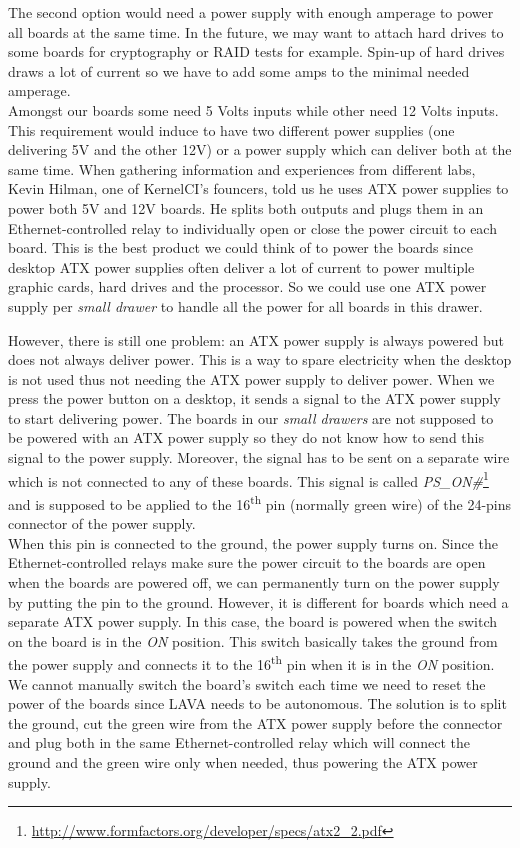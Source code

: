 The second option would need a power supply with enough amperage to power all boards at the same time. In the future, we may want to attach hard drives to some boards for cryptography or RAID tests for example. Spin-up of hard drives draws a lot of current so we have to add some amps to the minimal needed amperage.\\
Amongst our boards some need 5 Volts inputs while other need 12 Volts inputs. This requirement would induce to have two different power supplies (one delivering 5V and the other 12V) or a power supply which can deliver both at the same time. When gathering information and experiences from different labs, Kevin Hilman, one of KernelCI's founcers, told us he uses ATX power supplies to power both 5V and 12V boards. He splits both outputs and plugs them in an Ethernet-controlled relay to individually open or close the power circuit to each board. This is the best product we could think of to power the boards since desktop ATX power supplies often deliver a lot of current to power multiple graphic cards, hard drives and the processor. So we could use one ATX power supply per \textit{small drawer} to handle all the power for all boards in this drawer.

However, there is still one problem: an ATX power supply is always powered but does not always deliver power. This is a way to spare electricity when the desktop is not used thus not needing the ATX power supply to deliver power. When we press the power button on a desktop, it sends a signal to the ATX power supply to start delivering power. The boards in our \textit{small drawers} are not supposed to be powered with an ATX power supply so they do not know how to send this signal to the power supply. Moreover, the signal has to be sent on a separate wire which is not connected to any of these boards. This signal is called \textit{PS\_ON\#}\footnote{\url{http://www.formfactors.org/developer/specs/atx2\_2.pdf}} and is supposed to be applied to the 16\textsuperscript{th} pin (normally green wire) of the 24-pins connector of the power supply.\\
When this pin is connected to the ground, the power supply turns on. Since the Ethernet-controlled relays make sure the power circuit to the boards are open when the boards are powered off, we can permanently turn on the power supply by putting the pin to the ground. However, it is different for boards which need a separate ATX power supply. In this case, the board is powered when the switch on the board is in the \textit{ON} position. This switch basically takes the ground from the power supply and connects it to the 16\textsuperscript{th} pin when it is in the \textit{ON} position. We cannot manually switch the board's switch each time we need to reset the power of the boards since LAVA needs to be autonomous. The solution is to split the ground, cut the green wire from the ATX power supply before the connector and plug both in the same Ethernet-controlled relay which will connect the ground and the green wire only when needed, thus powering the ATX power supply.

